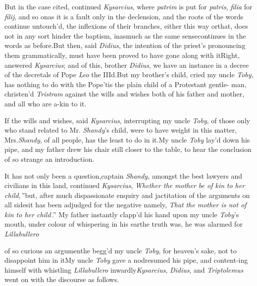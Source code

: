 \documentclass{article}
\begin{document}
But in the case cited, continued \textit{Kysarcius}, where
\textit{patrim} is put for \textit{patris}, \textit{filia}
for \textit{filij}, and so on\tsk as it is a fault only in
the declension, and the roots of the words continue
untouch’d, the inflexions of their branches, either this way
or\break that, does not in any sort hinder the baptism,
inasmuch as the same sense\break continues in the words as
before.\tsk But then, said \textit{Didius}, the intention of
the priest’s pronouncing them grammatically, must have been
proved to have gone along with it\tsk Right, answered
\textit{Kysarcius}; and of this, brother \textit{Didius}, we
have an instance in a decree of the de\-cretals of Pope
\textit{Leo} the IIId.\tsk But my brother’s child, cried my
uncle \textit{Toby},\break
has nothing to do with the Pope\tsk ’tis\break
the plain child of a Protestant gentle-\break
man, christen’d \textit{Tristram} against the wills\break
and wishes both of his father and mother,\break
and all who are a-kin to it.\tsk

If the wills and wishes, said \textit{Kysarcius}, interrupting my
uncle \textit{Toby}, of those only who stand related to Mr.\@
\textit{Shandy}’s child, were to have weight in this matter,
Mrs.\@ \textit{Shandy}, of all people, has the least to do in
it.\tsk My uncle \textit{Toby} lay’d down his pipe, and my father drew his chair still closer to
the table, to hear the conclusion of so strange an
introduction.

It has not only been a question,\break captain \textit{Shandy}, amongst the
\lower-3pt\hbox{\ast} best law\-yers and civilians in this land,
continued \textit{Kys\-arcius}, \lqq\textit{Whether the
mother be of kin}\break
\lqq \textit{to her child},\,”\tsk but, after much
dispas\-sionate enquiry and jactitation of the arguments on
all sides\tsk it has been adjudged for the negative\tsk
namely, \lqq\textit{That}\break
\lqq \textit{the mother is not of kin to her child}\,\dagger.”\break
My father instantly clapp’d his hand\break
upon my uncle \textit{Toby}’s mouth, under co\-lour of whispering in his
ear\tsk the truth\break
was, he was alarmed for \textit{Lillabullero}\tsk\break
{}\break
{}
\vskip 2pt
\vskip -3pt

\newpage\noindent
of so curious an argument\tsk he begg’d my
uncle \textit{Toby}, for heaven’s sake, not to disappoint him in it\tsk My uncle
\textit{Toby} gave a nod\tsk resumed his pipe, and
content-\break ing himself with whistling
\textit{Lillabullero}\break
inwardly\tsh \textit{Kysarcius}, \textit{Didius}, and
\textit{Triptolemus} went on with the discourse as follows.
\end{document}
